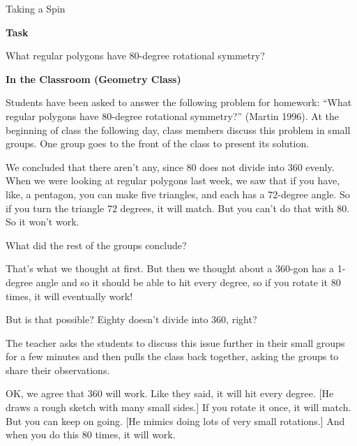 \TriExample
  {
    Taking a Spin
  }
  {
    \textbf{Task}

    What regular polygons have 80-degree rotational symmetry?

    \textbf{In the Classroom (Geometry Class)}

    Students have been asked to answer the following problem for homework: ``What regular polygons have 80-degree rotational symmetry?'' (Martin 1996). At the beginning of class the following day, class members discuss this problem in small groups. One group goes to the front of the class to present its solution.

    \begin{scriptlist}
      \item [Student 1:] We concluded that there aren't any, since $80$ does not divide into $360$ evenly. When we were looking at regular polygons last week, we saw that if you have, like, a pentagon, you can make five triangles, and each has a 72-degree angle. So if you turn the triangle $72$ degrees, it will match. But you can't do that with $80$. So it won't work.\vspace{2\baselineskip}

      \item [Teacher:] What did the rest of the groups conclude?

      \item [Student 2:] That's what we thought at first. But then we thought about a 360-gon has a 1-degree angle and so it should be able to hit every degree, so if you rotate it $80$ times, it will eventually work!

      \item [Student 1:] But is that possible? Eighty doesn't divide into $360$, right?
    \end{scriptlist}\vspace{\baselineskip}

    The teacher asks the students to discuss this issue further in their small groups for a few minutes and then pulls the class back together, asking the groups to share their observations.

    \begin{scriptlist}
      \item [Student 3:] OK, we agree that $360$ will work. Like they said, it will hit every degree. [He draws a rough sketch with many small sides.] If you rotate it once, it will match. But you can keep on going. [He mimics doing lots of very small rotations.] And when you do this $80$ times, it will work.\vspace{2\baselineskip}


\end{scriptlist}}
